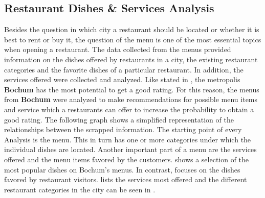 \subsection{Restaurant Dishes \& Services Analysis}
\label{subsec:menu}
Besides the question in which city a restaurant should be located or whether it is best to rent or buy it,
the question of the menu is one of the most essential topics when opening a restaurant.
\newline
The data collected from the menus provided information on the dishes offered by restaurants in a city,
the existing restaurant categories and the favorite dishes of a particular restaurant.
In addition, the services offered were collected and analyzed.
\newline
Like stated in , the metropolis \textbf{Bochum} has the most potential to get a good rating.
For this reason, the menus from \textbf{Bochum} were analyzed to make recommendations for possible menu items and service which a restaurants can offer
to increase the probability to obtain a good rating.
\newline
The following graph shows a simplified representation of the relationships between the scrapped information.
The starting point of every Analysis is the menu.
This in turn has one or more categories under which the individual dishes are located.
Another important part of a menu are the services offered and the menu items favored by the customers.
\newline
{} shows a selection of the most popular dishes on Bochum's menus.
In contrast,  focuses on the dishes favored by restaurant visitors.
 lists the services most offered and the different restaurant categories in the city can be seen in .
